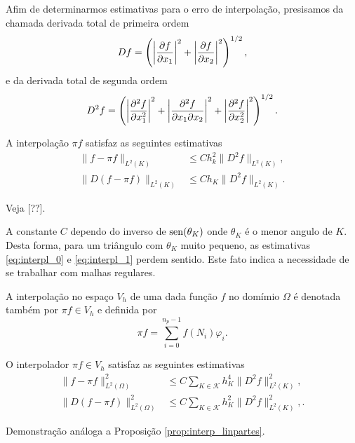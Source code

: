 Afim de determinarmos estimativas para o erro de interpolação, presisamos da chamada derivada total de primeira ordem
\begin{equation}
  Df = \left(\left|\frac{\partial f}{\partial x_1}\right|^2 + \left|\frac{\partial f}{\partial x_2}\right|^2\right)^{1/2},
\end{equation}
e da derivada total de segunda ordem
\begin{equation}
  D^2f = \left(\left|\frac{\partial^2 f}{\partial x_1^2}\right|^2 + \left|\frac{\partial^2 f}{\partial x_1\partial x_2}\right|^2 + \left|\frac{\partial^2 f}{\partial x_2^2}\right|^2\right)^{1/2}.
\end{equation}

\begin{prop}\label{prop:interpl}
  A interpolação $\pi f$ satisfaz as seguintes estimativas
  \begin{align}
    \|f - \pi f\|_{L^2(K)} &\leq Ch_k^2\|D^2f\|_{L^2(K)},\label{eq:interpl_0}\\
    \|D(f - \pi f)\|_{L^2(K)} &\leq Ch_K\|D^2 f\|_{L^2(K)}.\label{eq:interpl_1}
  \end{align}
\end{prop}
\begin{dem}
  Veja [??].
\end{dem}

\begin{obs}
  A constante $C$ dependo do inverso de $\operatorname{sen}(\theta_K)$ onde $\theta_K$ é o menor angulo de $K$. Desta forma, para um triângulo com $\theta_K$ muito pequeno, as estimativas \eqref{eq:interpl_0} e \eqref{eq:interpl_1} perdem sentido. Este fato indica a necessidade de se trabalhar com malhas regulares.
\end{obs}

A interpolação no espaço $V_h$ de uma dada função $f$ no domímio $\Omega$ é denotada também por $\pi f\in V_h$ e definida por
\begin{equation}
  \pi f = \sum_{i=0}^{n_p-1} f(N_i)\varphi_i.
\end{equation}

\begin{prop}\label{prop:interpc}
  O interpolador $\pi f\in V_h$ satisfaz as seguintes estimativas
  \begin{align}
    \|f - \pi f\|_{L^2(\Omega)}^2 &\leq C\sum_{K\in\mathcal{K}} h_K^4\|D^2 f\|_{L^2(K)}^2,\label{eq:interpc_0}\\
    \|D(f - \pi f)\|_{L^2(\Omega)}^2 &\leq C\sum_{K\in\mathcal{K}} h_K^2\|D^2 f\|_{L^2(K)}^2,\label{eq:interpc_1}.
  \end{align}
\end{prop}
\begin{dem}
  Demonstração análoga a Proposição \ref{prop:interp_linpartes}.
\end{dem}

